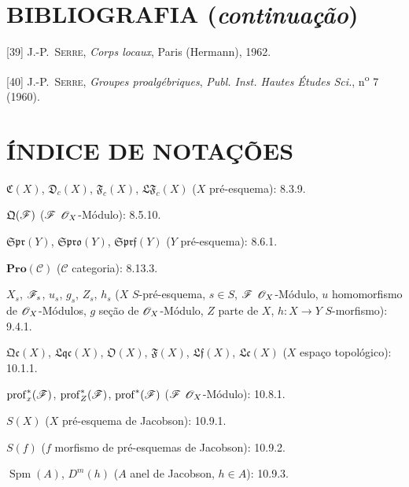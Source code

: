 \clearpage
{}
{}
\section*{BIBLIOGRAFIA (\emph{continuação})}

\begingroup
\small
\setlength{\parindent}{0pt}
\setlength{\parskip}{3pt}
[39] J.-P.~\textsc{Serre}, \emph{Corps locaux}, Paris (Hermann), 1962.

[40] J.-P.~\textsc{Serre}, \emph{Groupes proalgébriques}, \emph{Publ. Inst. Hautes Études Sci.}, n\textsuperscript{o} 7 (1960).

\endgroup

\clearpage
{}
{}
\section*{ÍNDICE DE NOTAÇÕES}

\begingroup
\small
\setlength{\parindent}{0pt}
\setlength{\parskip}{2pt}

$\mathfrak C(X)$, $\mathfrak D_c(X)$, $\mathfrak F_c(X)$,
$\mathfrak{LF}_c(X)$ ($X$ pré-esquema): 8.3.9.

$\mathfrak Q(\mathscr{F})$ ($\mathscr{F}$ $\mathscr{O}_X$-Módulo): 8.5.10.

$\mathfrak{Spr}(Y)$, $\mathfrak{Spro}(Y)$, $\mathfrak{Sprf}(Y)$
($Y$ pré-esquema): 8.6.1.

$\mathbf{Pro}(\mathcal C)$ ($\mathcal C$ categoria): 8.13.3.

$X_s$, $\mathscr{F}_s$, $u_s$, $g_s$, $Z_s$, $h_s$
($X$ $S$-pré-esquema, $s\in S$, $\mathscr{F}$ $\mathscr{O}_X$-Módulo,
$u$ homomorfismo de $\mathscr{O}_X$-Módulos, $g$ seção de
$\mathscr{O}_X$-Módulo, $Z$ parte de $X$, $h:X\to Y$ $S$-morfismo): 9.4.1.

$\mathfrak{Qc}(X)$, $\mathfrak{Lqc}(X)$, $\mathfrak O(X)$,
$\mathfrak F(X)$, $\mathfrak{Lf}(X)$, $\mathfrak{Lc}(X)$
($X$ espaço topológico): 10.1.1.

$\operatorname{prof}^{*}_{x}(\mathscr{F})$,
$\operatorname{prof}^{*}_{Z}(\mathscr{F})$,
$\operatorname{prof}^{*}(\mathscr{F})$
($\mathscr{F}$ $\mathscr{O}_X$-Módulo): 10.8.1.

$S(X)$ ($X$ pré-esquema de Jacobson): 10.9.1.

$S(f)$ ($f$ morfismo de pré-esquemas de Jacobson): 10.9.2.

$\operatorname{Spm}(A)$, $D^m(h)$ ($A$ anel de Jacobson, $h\in A$): 10.9.3.

